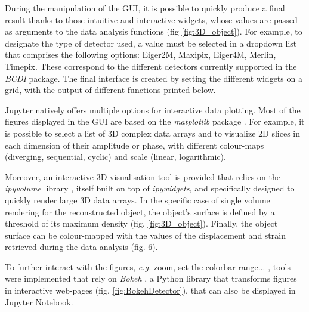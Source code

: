 During the manipulation of the GUI, it is possible to quickly produce a final result thanks to those intuitive and interactive widgets, whose values are passed as arguments to the data analysis functions (fig \ref{fig:3D_object}).
For example, to designate the type of detector used, a value must be selected in a dropdown list that comprises the following options: Eiger2M, Maxipix, Eiger4M, Merlin, Timepix.
These correspond to the different detectors currently supported in the \textit{BCDI} package.
The final interface is created by setting the different widgets on a grid, with the output of different functions printed below.


Jupyter natively offers multiple options for interactive data plotting.
Most of the figures displayed in the GUI are based on the \textit{matplotlib} package \parencite{hunter2007matplotlib}.
For example, it is possible to select a list of 3D complex data arrays and to visualize 2D slices in each dimension of their amplitude or phase, with different colour-maps (diverging, sequential, cyclic) and scale (linear, logarithmic).

Moreover, an interactive 3D visualisation tool is provided that relies on the \textit{ipyvolume} library \parencite{ipyvolume}, itself built on top of \textit{ipywidgets}, and specifically designed to quickly render large 3D data arrays.
In the specific case of single volume rendering for the reconstructed object, the object's surface is defined by a threshold of its maximum density (fig. \ref{fig:3D_object}).
Finally, the object surface can be colour-mapped with the values of the displacement and strain retrieved during the data analysis (fig. 6).

To further interact with the figures, \textit{e.g.} zoom, set the colorbar range... , tools were implemented that rely on \textit{Bokeh} \parencite{Bokeh}, a Python library that transforms figures in interactive web-pages (fig. \ref{fig:BokehDetector}), that can also be displayed in Jupyter Notebook.

